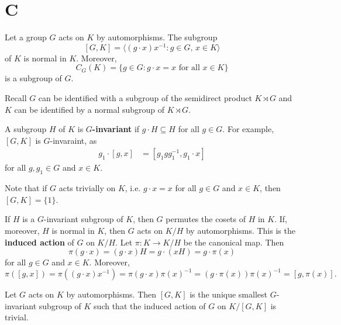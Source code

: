 \begin{corollary}
	
\end{corollary}

\section*{C}



Let a group $G$ acts on $K$ by automorphisms. The subgroup
\[
[G,K]=\langle (g\cdot x)x^{-1}:g\in G,\,x\in K\rangle
\]
of $K$ is normal in $K$. Moreover, 
\[
C_G(K)=\{g\in G:g\cdot x=x\text{ for all $x\in K$}\}
\]
is a subgroup of $G$. 

Recall $G$ can be identified with a subgroup
of the semidirect product $K\rtimes G$ and $K$ can be identified by a normal 
subgroup of $K\rtimes G$. 

A subgroup $H$ of $K$ is \textbf{$G$-invariant} if $g\cdot H\subseteq H$ for all $g\in G$. 
For example, $[G,K]$ is $G$-invaraint, as
\begin{align*}
g_1\cdot [g,x]&=[g_1gg_1^{-1}, g_1\cdot x]
\end{align*}
for all $g,g_1\in G$ and $x\in K$.

Note that if $G$ acts trivially on $K$, i.e. $g\cdot x=x$ for all $g\in G$ and $x\in K$, then 
$[G,K]=\{1\}$. 

If $H$ is a $G$-invariant subgroup of $K$, then $G$ permutes the cosets of $H$ in $K$. If, moreover, $H$ is normal in $K$, then
$G$ acts on $K/H$ by automorphisms. This is the \textbf{induced action} of $G$ on $K/H$. Let $\pi\colon K\to K/H$ be the canonical
map. Then 
\[
\pi(g\cdot x)=(g\cdot x)H=g\cdot (xH)=g\cdot\pi(x)
\]
for all $g\in G$ and $x\in K$. Moreover, 
\[
\pi([g,x])=\pi( (g\cdot x)x^{-1})=\pi(g\cdot x)\pi(x)^{-1}=(g\cdot\pi(x))\pi(x)^{-1}=[g,\pi(x)].
\]

\begin{exercise}
Let $G$ acts on $K$ by automorphisms. Then $[G,K]$ is the unique smallest $G$-invariant 
subgroup of $K$ such that the induced action of $G$ on $K/[G,K]$ is trivial. 	
\end{exercise}



